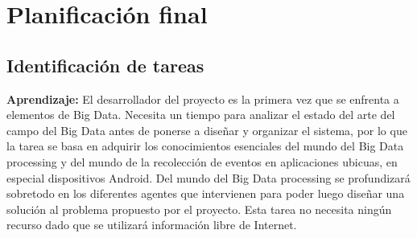 \chapter{Planificación final}\label{cap:planificacion}
\section{Identificación de tareas}
\textbf{Aprendizaje:} El desarrollador del proyecto es la primera vez que se enfrenta a elementos de Big Data. Necesita un tiempo para analizar el estado del arte del campo del Big Data antes de ponerse a diseñar y organizar el sistema, por lo que la tarea se basa en adquirir los conocimientos esenciales del mundo del Big Data processing y del mundo de la recolección de eventos en aplicaciones ubicuas, en especial dispositivos Android. Del mundo del Big Data processing se profundizará sobretodo en los diferentes agentes que intervienen para poder luego diseñar una solución al problema propuesto por el proyecto. Esta tarea no necesita ningún recurso dado que se utilizará información libre de Internet.


